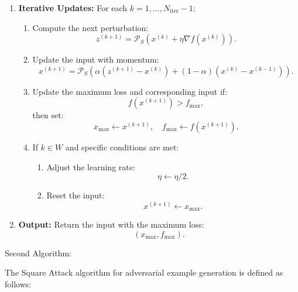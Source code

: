 \begin{enumerate}
    \item \textbf{Iterative Updates:}  
    For each $k = 1, \dots, N_{\text{iter}} - 1$:
    \begin{enumerate}
        \item Compute the next perturbation:  
        \[
        z^{(k+1)} = \mathcal{P}_S \left( x^{(k)} + \eta \nabla f(x^{(k)}) \right).
        \]
        \item Update the input with momentum:  
        \[
        x^{(k+1)} = \mathcal{P}_S \left( \alpha (z^{(k+1)} - x^{(k)}) + (1 - \alpha)(x^{(k)} - x^{(k-1)}) \right).
        \]
        \item Update the maximum loss and corresponding input if:  
        \[
        f(x^{(k+1)}) > f_{\text{max}},
        \]
        then set:  
        \[
        x_{\text{max}} \gets x^{(k+1)}, \quad f_{\text{max}} \gets f(x^{(k+1)}).
        \]
        \item If $k \in W$ and specific conditions are met:
        \begin{enumerate}
            \item Adjust the learning rate:  
            \[
            \eta \gets \eta / 2.
            \]
            \item Reset the input:  
            \[
            x^{(k+1)} \gets x_{\text{max}}.
            \]
        \end{enumerate}
    \end{enumerate}

    \item \textbf{Output:}  
    Return the input with the maximum loss:
    \[
    (x_{\text{max}}, f_{\text{max}}).
    \]
\end{enumerate}

Second Algorithm:

The Square Attack algorithm for adversarial example generation is defined as follows:

